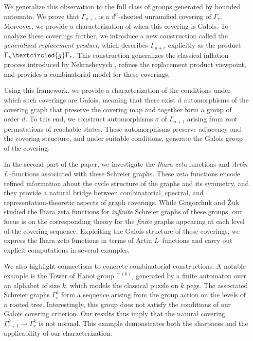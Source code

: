 \documentclass{article}
\newcommand{\G}{\Gamma}
\newcommand{\g}{\textcircled{g}}
\begin{document}
We generalize this observation to the full class of groups generated by bounded automata. We prove that $\G_{n+r}$ is a $d^n$-sheeted unramified covering of $\G_r$. Moreover, we provide a characterization of when this covering is Galois. To analyze these coverings further, we introduce a new construction called the \emph{generalized replacement product}, which describes $\G_{n+r}$ explicitly as the product $\G_n \g \G_r$. This construction generalizes the classical inflation process introduced by Nekrashevych \cite{nekrashevych2005self}, refines the replacement product viewpoint, and provides a combinatorial model for these coverings. 

Using this framework, we provide a characterization of the conditions under which such coverings are Galois, meaning that there exist $d$ automorphisms of the covering graph that preserve the covering map and together form a group of order $d$. To this end, we construct automorphisms $\sigma$ of $\G_{n+1}$ arising from root permutations of reachable states. These automorphisms preserve adjacency and the covering structure, and under suitable conditions, generate the Galois group of the covering.

In the second part of the paper, we investigate the \emph{Ihara zeta} functions and \emph{Artin $L$}--functions associated with these Schreier graphs. These zeta functions encode refined information about the cycle structure of the graphs and its symmetry, and they provide a natural bridge between combinatorial, spectral, and representation-theoretic aspects of graph coverings. While Grigorchuk and {\.Z}uk ~\cite{grigorchuk2004ihara} studied the Ihara zeta functions for \emph{infinite} Schreier graphs of these groups, our focus is on the corresponding theory for the \emph{finite} graphs appearing at each level of the covering sequence. Exploiting the Galois structure of these coverings, we express the Ihara zeta functions in terms of Artin $L$--functions and carry out explicit computations in several examples. 

We also highlight connections to concrete combinatorial constructions. A notable example is the Tower of Hanoi group $\mathbb{T}^{(k)}$, generated by a finite automaton over an alphabet of size $k$, which models the classical puzzle on $k$ pegs. The associated Schreier graphs $\G_r^k$ form a sequence arising from the group action on the levels of a rooted tree. Interestingly, this group does not satisfy the conditions of our Galois covering criterion. Our results thus imply that the natural covering $\G_{r+1}^k \to \G_r^k$ is not normal. This example demonstrates both the sharpness and the applicability of our characterization. 
\end{document}
